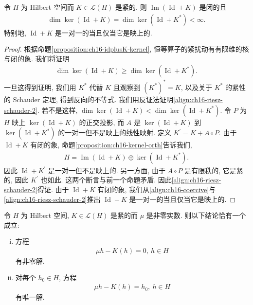 \documentclass[../../main.tex]{subfiles}
\begin{document}
\begin{theorem}\label{theorem:ch16-riesz-schauder}
令 $H$ 为 Hilbert 空间而 $K\in\mathcal{L}(H)$ 是紧的. 则 $\operatorname{Im}(\operatorname{Id}+K)$ 是闭的且
\begin{align}
\dim\ker(\operatorname{Id}+K)=\dim\ker(\operatorname{Id}+K^{*})<\infty.\label{align:ch16-riesz-schauder-1}
\end{align}
特别地, $\operatorname{Id}+K$ 是一对一的当且仅当它是映上的.
\end{theorem}

\begin{proof}
根据命题\cref{proposition:ch16-idplusK-kernel}, 恒等算子的紧扰动有有限维的核与闭的象. 我们将证明
\begin{align}
\dim\ker(\operatorname{Id}+K)\geqslant\dim\ker(\operatorname{Id}+K^{*}).\label{align:ch16-riesz-schauder-2}
\end{align}
一旦这得到证明, 我们用 $K^{*}$ 代替 $K$ 且观察到 $(K^{*})^{*}=K$, 以及关于 $K^{*}$ 的紧性的 Schauder 定理, 得到反向的不等式. 我们用反证法证明\eqref{align:ch16-riesz-schauder-2}. 若不是这样, $\dim\ker(\operatorname{Id}+K)<\dim\ker(\operatorname{Id}+K^{*})$. 令 $P$ 为 $H$ 映上 $\ker(\operatorname{Id}+K)$ 的正交投影, 而 $A$ 是 $\ker(\operatorname{Id}+K)$ 到 $\ker(\operatorname{Id}+K^{*})$ 的一对一但不是映上的线性映射. 定义 $K^{\prime}=K+A\circ P$. 由于 $\operatorname{Id}+K$ 有闭的象, 命题\cref{proposition:ch16-kernel-orth}告诉我们,
\begin{align*}
H=\operatorname{Im}(\operatorname{Id}+K)\oplus\ker(\operatorname{Id}+K^{*}).
\end{align*}
因此 $\operatorname{Id}+K^{\prime}$ 是一对一但不是映上的. 另一方面, 由于 $A\circ P$ 是有限秩的, 它是紧的, 因此 $K^{\prime}$ 也如此. 这两个断言与前一个命题矛盾. 因此\eqref{align:ch16-riesz-schauder-2}得证. 由于 $\operatorname{Id}+K$ 有闭的象, 我们从\eqref{align:ch16-coercive}与\eqref{align:ch16-riesz-schauder-2}推出 $\operatorname{Id}+K$ 是一对一的当且仅当它是映上的.
\end{proof}

\begin{corollary}\label{corollary:ch16-fredholm-alternative}
令 $H$ 为 Hilbert 空间, $K\in\mathcal{L}(H)$ 是紧的而 $\mu$ 是非零实数. 则以下结论恰有一个成立:
\begin{enumerate}[(i)]
\item 方程
\begin{align*}
\mu h-K(h)=0,\ h\in H
\end{align*}
有非零解.
\item 对每个 $h_{0}\in H$, 方程
\begin{align*}
\mu h-K(h)=h_{0},\ h\in H
\end{align*}
有唯一解.
\end{enumerate}
\end{corollary}
\end{document}
